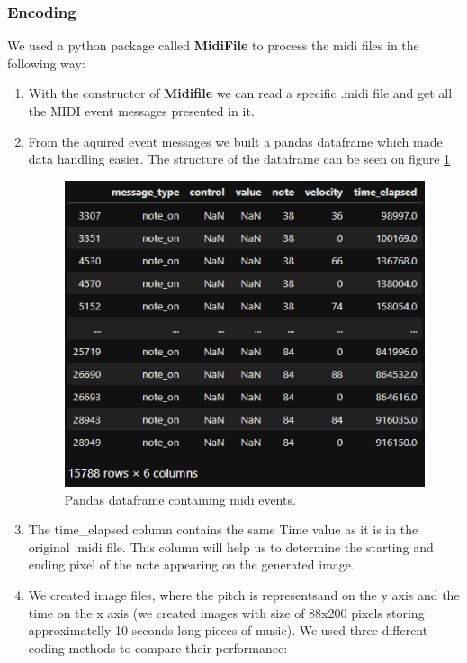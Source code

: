 \documentclass{article}
\begin{document}
	\subsubsection{Encoding}
	We used a python package called \textbf{MidiFile} to process the midi files in the following way:
	\begin{enumerate}
		\item With the constructor of \textbf{Midifile} we can read a specific .midi file and get all the MIDI event messages presented in it. 
		\item From the aquired event messages we built a pandas dataframe which made data handling easier. The structure of the dataframe can be seen on figure \ref{fig:dframe}
		
		\begin{figure}[!htb]
			\centering
			\includegraphics[width=\linewidth]{dframe.png}
			\caption{Pandas dataframe containing midi events.}
			\label{fig:dframe}
		\end{figure}
		\item The time\_elapsed column contains the same Time value as it is in the original .midi file. This column will help us to determine the starting and ending pixel of the note appearing on the generated image.
		\item We created image files, where the pitch is representsand on the y axis and the time on the x axis (we created images with size of 88x200 pixels storing approximatelly 10 seconds long pieces of music). We used three different coding methods to compare their performance: 

\end{enumerate}
\end{document}
